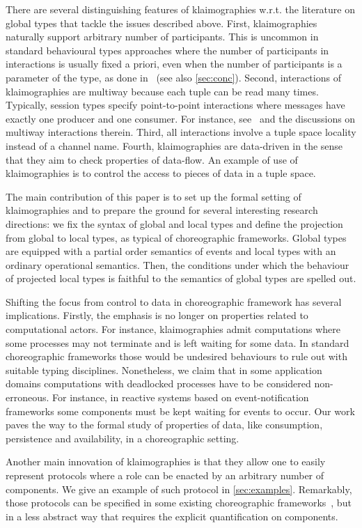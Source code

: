 There are several distinguishing features of klaimographies w.r.t.
the literature on global types that tackle the issues described above.
%
First, klaimographies naturally support arbitrary number of
participants.
%
This is uncommon in standard behavioural types approaches where the
number of participants in interactions is usually fixed a priori, even
when the number of participants is a parameter of the type, as done
in~\cite{ydbh10} (see also \cref{sec:conc}).
%
Second, interactions of klaimographies are multiway because each tuple
can be read many times.
%
Typically, session types specify point-to-point interactions where
messages have exactly one producer and one consumer.
%
For instance, see~\cite{cdp12} and the discussions on multiway
interactions therein.
%
Third, all interactions involve a tuple space locality instead of a
channel name.
%
Fourth, klaimographies are data-driven in the sense that they
aim to check properties of data-flow.
%
An example of use of klaimographies is to control the access to pieces
of data in a tuple space.

The main contribution of this paper is to set up the formal setting of
klaimographies and to prepare the ground for several interesting
research directions: we fix the syntax of global and local types and
define the projection from global to local types, as typical of
choreographic frameworks.  Global types are equipped with a partial
order semantics of events and local types with an ordinary operational
semantics. Then, the conditions under which the behaviour of projected
local types is faithful to the semantics of global types are spelled
out.

Shifting the focus from control to data in choreographic framework has
several implications.
%
Firstly, the emphasis is no longer on properties related to
computational actors.
%
For instance, klaimographies admit computations where some processes
may not terminate and is left waiting for some data.
%
In standard choreographic frameworks those would be undesired behaviours
to rule out with suitable typing disciplines.
%
Nonetheless, we claim that in some application domains computations with
deadlocked processes have to be considered non-erroneous.
%
For instance, in reactive systems based on event-notification
frameworks some  components must be kept waiting for
events to occur.
%
Our work paves the way to the formal study of properties of data, like consumption, persistence and availability, in a choreographic setting.

Another main innovation of klaimographies is that they allow one to
easily represent protocols where a role can be enacted by an arbitrary
number of components.
%
We give an example of such protocol in \cref{sec:examples}.
%
Remarkably, those protocols can be specified in some existing
choreographic frameworks~\cite{ydbh10,chjny19}, but in a less abstract way
that requires the explicit quantification on components.

